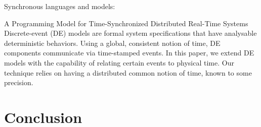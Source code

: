 \documentclass[sigplan,screen]{acmart}
\begin{document}
Synchronous languages and models:

A Programming Model for Time-Synchronized Distributed Real-Time Systems
Discrete-event (DE) models are formal system specifications that have analysable deterministic behaviors. Using a global, consistent notion of time, DE components communicate via time-stamped events.
In this paper, we extend DE models with the capability of relating certain events to physical time.
Our technique relies on having a distributed common notion of time, known to some precision.




\section{Conclusion}



\end{document}
